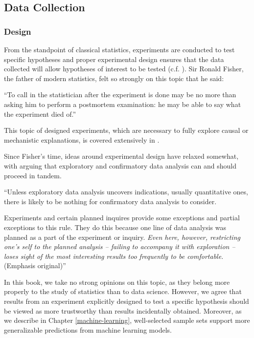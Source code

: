 \documentclass[
]{krantz}
\renewenvironment{quote}{\begin{VF}}{\end{VF}}
\begin{document}
\hypertarget{data-collection2}{%
\subsection{Data Collection}\label{data-collection2}}

\hypertarget{design}{%
\subsubsection{Design}\label{design}}

From the standpoint of classical statistics, experiments are conducted to test specific hypotheses and proper experimental design ensures that the data collected will allow hypotheses of interest to be tested (c.f. \citet{Fisher1935}). Sir Ronald Fisher, the father of modern statistics, felt so strongly on this topic that he said:

\begin{quote}
``To call in the statistician after the experiment is done may be no more than asking him to perform a postmortem examination: he may be able to say what the experiment died of.''
\end{quote}

This topic of designed experiments, which are necessary to fully explore causal or mechanistic explanations, is covered extensively in \citet{Lawson2014}.

Since Fisher's time, ideas around experimental design have relaxed somewhat, with \citet{Tukey1977} arguing that exploratory and confirmatory data analysis can and should proceed in tandem.

\begin{quote}
``Unless exploratory data analysis uncovers indications, usually quantitative ones, there is likely to be nothing for confirmatory data analysis to consider.

Experiments and certain planned inquires provide some exceptions and partial exceptions to this rule. They do this because one line of data analysis was planned as a part of the experiment or inquiry. \emph{Even here, however, restricting one's self to the planned analysis -- failing to accompany it with exploration -- loses sight of the most interesting results too frequently to be comfortable.} (Emphasis original)''
\end{quote}

In this book, we take no strong opinions on this topic, as they belong more properly to the study of statistics than to data science. However, we agree that results from an experiment explicitly designed to test a specific hypothesis should be viewed as more trustworthy than results incidentally obtained. Moreover, as we describe in Chapter \ref{machine-learning}, well-selected sample sets support more generalizable predictions from machine learning models.
\end{document}
